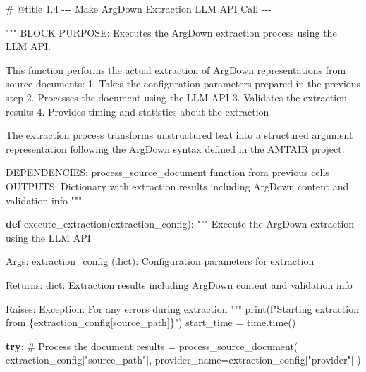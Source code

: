 \documentclass[
  11pt,
  letterpaper,
]{book}
\newenvironment{Shaded}{\begin{snugshade}}{\end{snugshade}}
\newcommand{\BuiltInTok}[1]{\textcolor[rgb]{0.00,0.23,0.31}{#1}}
\newcommand{\CommentTok}[1]{\textcolor[rgb]{0.37,0.37,0.37}{#1}}
\newcommand{\ControlFlowTok}[1]{\textcolor[rgb]{0.00,0.23,0.31}{\textbf{#1}}}
\newcommand{\KeywordTok}[1]{\textcolor[rgb]{0.00,0.23,0.31}{\textbf{#1}}}
\newcommand{\NormalTok}[1]{\textcolor[rgb]{0.00,0.23,0.31}{#1}}
\newcommand{\OperatorTok}[1]{\textcolor[rgb]{0.37,0.37,0.37}{#1}}
\newcommand{\SpecialCharTok}[1]{\textcolor[rgb]{0.37,0.37,0.37}{#1}}
\newcommand{\SpecialStringTok}[1]{\textcolor[rgb]{0.13,0.47,0.30}{#1}}
\newcommand{\StringTok}[1]{\textcolor[rgb]{0.13,0.47,0.30}{#1}}
\begin{document}
\begin{Shaded}
\begin{Highlighting}[]
\CommentTok{\# @title 1.4 {-}{-}{-} Make ArgDown Extraction LLM API Call {-}{-}{-}}

\CommentTok{"""}
\CommentTok{BLOCK PURPOSE: Executes the ArgDown extraction process using the LLM API.}

\CommentTok{This function performs the actual extraction of ArgDown representations from source documents:}
\CommentTok{1. Takes the configuration parameters prepared in the previous step}
\CommentTok{2. Processes the document using the LLM API}
\CommentTok{3. Validates the extraction results}
\CommentTok{4. Provides timing and statistics about the extraction}

\CommentTok{The extraction process transforms unstructured text into a structured argument}
\CommentTok{representation following the ArgDown syntax defined in the AMTAIR project.}

\CommentTok{DEPENDENCIES: process\_source\_document function from previous cells}
\CommentTok{OUTPUTS: Dictionary with extraction results including ArgDown content and validation info}
\CommentTok{"""}

\KeywordTok{def}\NormalTok{ execute\_extraction(extraction\_config):}
    \CommentTok{"""}
\CommentTok{    Execute the ArgDown extraction using the LLM API}

\CommentTok{    Args:}
\CommentTok{        extraction\_config (dict): Configuration parameters for extraction}

\CommentTok{    Returns:}
\CommentTok{        dict: Extraction results including ArgDown content and validation info}

\CommentTok{    Raises:}
\CommentTok{        Exception: For any errors during extraction}
\CommentTok{    """}
    \BuiltInTok{print}\NormalTok{(}\SpecialStringTok{f"Starting extraction from }\SpecialCharTok{\{}\NormalTok{extraction\_config[}\StringTok{\textquotesingle{}source\_path\textquotesingle{}}\NormalTok{]}\SpecialCharTok{\}}\SpecialStringTok{"}\NormalTok{)}
\NormalTok{    start\_time }\OperatorTok{=}\NormalTok{ time.time()}

    \ControlFlowTok{try}\NormalTok{:}
        \CommentTok{\# Process the document}
\NormalTok{        results }\OperatorTok{=}\NormalTok{ process\_source\_document(}
\NormalTok{            extraction\_config[}\StringTok{"source\_path"}\NormalTok{],}
\NormalTok{            provider\_name}\OperatorTok{=}\NormalTok{extraction\_config[}\StringTok{"provider"}\NormalTok{]}
\NormalTok{        )}


\end{Highlighting}
\end{Shaded}
\end{document}
